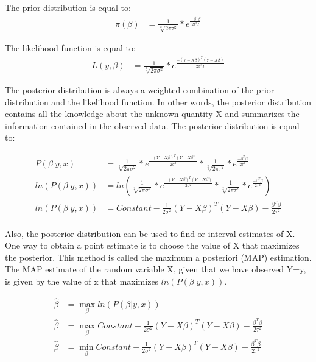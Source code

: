 \documentclass[12pt]{article}
\begin{document}
\begin{enumerate}
\begin{enumerate}
The prior distribution is equal to:
\begin{align*}
\pi(\beta) &= \frac{1}{\sqrt[2]{2\pi\tau^{2}}} * e^{\frac{-\beta^T\beta}{2\tau^{2}I}}
\end{align*}

The likelihood function is equal to:
\begin{align*}
L(y,\beta) &=  \frac{1}{\sqrt[2]{2\pi\sigma^{2}}} * e^{\frac{-(Y-X\beta)^T(Y-X\beta)}{2\sigma^{2}I}}
\end{align*}

The posterior distribution is always a weighted combination of the prior distribution and the likelihood function. In other words, the posterior distribution contains all the knowledge about the unknown quantity X and summarizes the information contained in the observed data. The posterior distribution is equal to:

\begin{align*}
P(\beta|y,x) &=  \frac{1}{\sqrt[2]{2\pi\sigma^{2}}} * e^{\frac{-(Y-X\beta)^T(Y-X\beta)}{2\sigma^{2}}} * \frac{1}{\sqrt[2]{2\pi\tau^{2}}} * e^{\frac{-\beta^T\beta}{2\tau^{2}}} \\
ln(P(\beta|y,x)) &= ln( \frac{1}{\sqrt[2]{2\pi\sigma^{2}}} * e^{\frac{-(Y-X\beta)^T(Y-X\beta)}{2\sigma^{2}}} * \frac{1}{\sqrt[2]{2\pi\tau^{2}}} * e^{\frac{-\beta^T\beta}{2\tau^{2}}}) \\
ln(P(\beta|y,x)) &= Constant - \frac{1}{2\sigma^{2}}(Y-X\beta)^T(Y-X\beta) - \frac{\beta^T\beta}{2\tau^2}
\end{align*}
\\

Also, the posterior distribution can be used to find or interval estimates of X. One way to obtain a point estimate is to choose the value of X that maximizes the posterior. This method is called the maximum a posteriori (MAP) estimation. The MAP estimate of the random variable X, given that we have observed Y=y, is given by the value of x that maximizes $ln(P(\beta|y,x))$. 

\begin{align*}
\hat\beta &= \max_{\beta} ln(P(\beta|y,x)) \\
\hat\beta &= \max_{\beta} Constant - \frac{1}{2\sigma^{2}}(Y-X\beta)^T(Y-X\beta) - \frac{\beta^T\beta}{2\tau^2} \\
\hat\beta &= \min_{\beta} Constant + \frac{1}{2\sigma^{2}}(Y-X\beta)^T(Y-X\beta) + \frac{\beta^T\beta}{2\tau^2} 
\end{align*}


\end{enumerate}
\end{enumerate}
\end{document}
